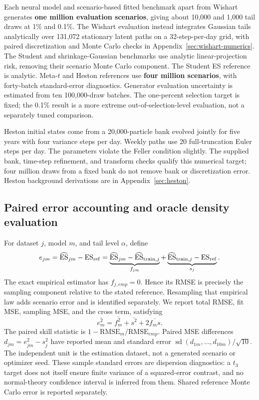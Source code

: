 \documentclass[11pt]{article}
\theoremstyle{definition}\newtheorem{definition}[theorem]{Definition}
\theoremstyle{remark}\newtheorem{remark}[theorem]{Remark}
\begin{document}
Each neural model and scenario-based fitted benchmark apart from Wishart generates \textbf{one million evaluation scenarios}, giving about 10,000 and 1,000 tail draws at 1\% and 0.1\%. The Wishart evaluation instead integrates Gaussian tails analytically over 131,072 stationary latent paths on a 32-step-per-day grid, with paired discretization and Monte Carlo checks in Appendix~\ref{sec:wishart-numerics}. The Student and shrinkage-Gaussian benchmarks use analytic linear-projection risk, removing their scenario Monte Carlo component. The Student ES reference is analytic. Meta-$t$ and Heston references use \textbf{four million scenarios}, with forty-batch standard-error diagnostics. Generator evaluation uncertainty is estimated from ten 100,000-draw batches. The one-percent selection target is fixed; the 0.1\% result is a more extreme out-of-selection-level evaluation, not a separately tuned comparison. 

Heston initial states come from a 20,000-particle bank evolved jointly for five years with four variance steps per day. Weekly paths use 20 full-truncation Euler steps per day. The parameters violate the Feller condition slightly. The supplied bank, time-step refinement, and transform checks qualify this numerical target; four million draws from a fixed bank do not remove bank or discretization error. Heston background derivations are in Appendix~\ref{sec:heston}.

\subsection{Paired error accounting and oracle density evaluation}
For dataset $j$, model $m$, and tail level $\alpha$, define
\begin{equation}\label{eq:decomposition}
e_{jm}=\widehat{\operatorname{ES}}_{jm}-\operatorname{ES}_{\rm ref}
=\underbrace{\widehat{\operatorname{ES}}_{jm}-\widehat{\operatorname{ES}}_{{\rm train},j}}_{f_{jm}}
+\underbrace{\widehat{\operatorname{ES}}_{{\rm train},j}-\operatorname{ES}_{\rm ref}}_{s_j}.
\end{equation}
The exact empirical estimator has $f_{j,emp}=0$. Hence its RMSE is precisely the sampling component relative to the stated reference. Resampling that empirical law adds scenario error and is identified separately. We report total RMSE, fit MSE, sampling MSE, and the cross term, satisfying
\begin{equation}
\overline{e_m^2}=\overline{f_m^2}+\overline{s^2}+2\overline{f_ms}.
\end{equation}
The paired skill statistic is $1-\mathrm{RMSE}_m/\mathrm{RMSE}_{emp}$. Paired MSE differences $d_{jm}=e_{jm}^2-s_j^2$ have reported mean and standard error $\operatorname{sd}(d_{1m},\ldots,d_{10m})/\sqrt{10}$. The independent unit is the estimation dataset, not a generated scenario or optimizer seed. These sample standard errors are dispersion diagnostics: a $t_3$ target does not itself ensure finite variance of a squared-error contrast, and no normal-theory confidence interval is inferred from them. Shared reference Monte Carlo error is reported separately.
\end{document}
